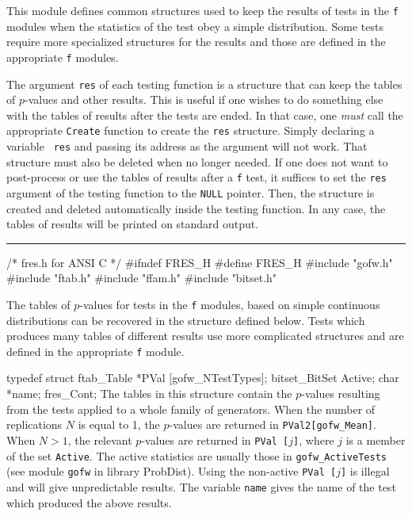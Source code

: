 
This module defines common structures used to keep the results of tests
in the {\tt f} modules when the statistics of the test obey a
simple distribution. Some tests require more specialized structures for
the results and those are defined in the appropriate {\tt f} modules.

The argument {\tt res} of each testing function is a structure
 that can keep the tables of $p$-values and other results.
This is useful if one wishes to do something else with the tables of
results after the tests are ended. In that case, one
{\it must} call the appropriate {\tt Create} function to create the
 {\tt res} structure. Simply declaring a variable  {\tt
res} and passing its address as the argument will not work.
That structure must also be deleted when no longer needed. If one does not
want to post-process or use the tables of results after a {\tt f} test,
it suffices to set the {\tt res} argument of the testing function
to the {\tt NULL} pointer.
Then, the structure is created and deleted automatically inside the
testing function. In any case, the tables of results will be printed on
standard output.

\bigskip
\hrule
\code
\hide
/* fres.h for ANSI C */
#ifndef FRES_H
#define FRES_H
\endhide
#include "gofw.h"
#include "ftab.h"
#include "ffam.h"
#include "bitset.h"
\endcode





The tables of $p$-values for tests in the {\tt f} modules, based on simple
continuous distributions can be recovered in the structure defined below.
Tests which produces many tables of different results use more complicated
structures and are defined in the appropriate {\tt f} module.

\code


typedef struct {
   ftab_Table *PVal [gofw_NTestTypes];
   bitset_BitSet Active;
   char *name;
} fres_Cont;
\endcode
 \tab
  The tables in this structure contain the $p$-values resulting from
  the tests applied to a whole family of generators.
  When the number of replications $N$ is equal to 1, the $p$-values
  are returned in {\tt PVal2[gofw\_Mean]}. When $N > 1$, the relevant
  $p$-values are returned in {\tt PVal [$j$]}, where  $j$ is a member
  of the set {\tt Active}. The active statistics are usually those
  in {\tt gofw\_ActiveTests} (see module {\tt gofw} in library
  ProbDist). Using the non-active {\tt PVal [$j$]} is illegal and will
  give unpredictable results. The variable
 {\tt name} gives the name of the test which produced the above results.
 \endtab
\code


